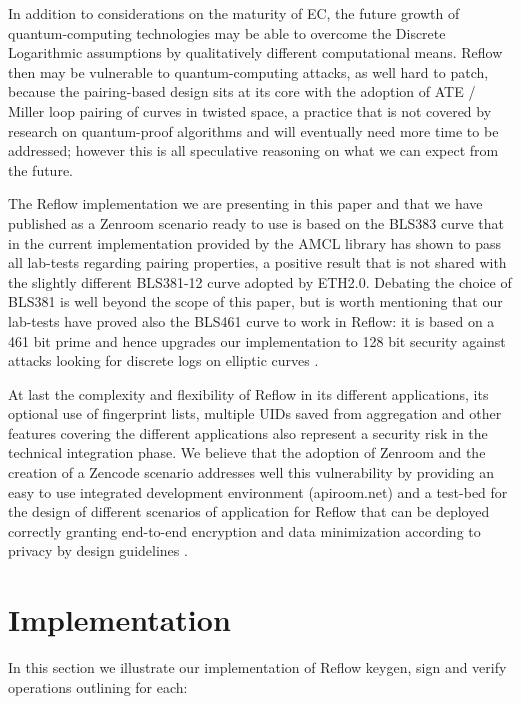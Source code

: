 \documentclass[twocolumn]{article}
\begin{document}
In addition to considerations on the maturity of EC, the future growth
of quantum-computing technologies may be able to overcome the Discrete
Logarithmic assumptions by qualitatively different computational
means. Reflow then may be vulnerable to quantum-computing
attacks, as well hard to patch, because the pairing-based design sits
at its core with the adoption of ATE / Miller loop pairing of curves
in twisted space, a practice that is not covered by research on
quantum-proof algorithms and will eventually need more time to be
addressed; however this is all speculative reasoning on what we can
expect from the future.

The Reflow implementation we are presenting in this paper and
that we have published as a Zenroom scenario ready to use is based on
the BLS383 curve \citep{bls383} that in the current implementation
provided by the AMCL library has shown to pass all lab-tests regarding
pairing properties, a positive result that is not shared with the
slightly different BLS381-12 curve adopted by ETH2.0. Debating the
choice of BLS381 is well beyond the scope of this paper, but is worth
mentioning that our lab-tests have proved also the BLS461 curve to work
in Reflow: it is based on a 461 bit prime and hence upgrades our
implementation to 128 bit security \citep{updating-key-pairings} against
attacks looking for discrete logs on elliptic curves
\citep{discrete-log-attack}.

At last the complexity and flexibility of Reflow in its
different applications, its optional use of fingerprint lists,
multiple UIDs saved from aggregation and other features covering the
different applications also represent a security risk in the technical
integration phase. We believe that the adoption of Zenroom and the
creation of a Zencode scenario addresses well this vulnerability by
providing an easy to use integrated development environment
(apiroom.net) and a test-bed for the design of different scenarios of
application for Reflow that can be deployed correctly granting
end-to-end encryption and data minimization according to privacy by
design guidelines \citep{privbydesign}.

\section{Implementation}
\label{sec:implementation}


In this section we illustrate our implementation of Reflow
keygen, sign and verify operations outlining for each:
\end{document}
